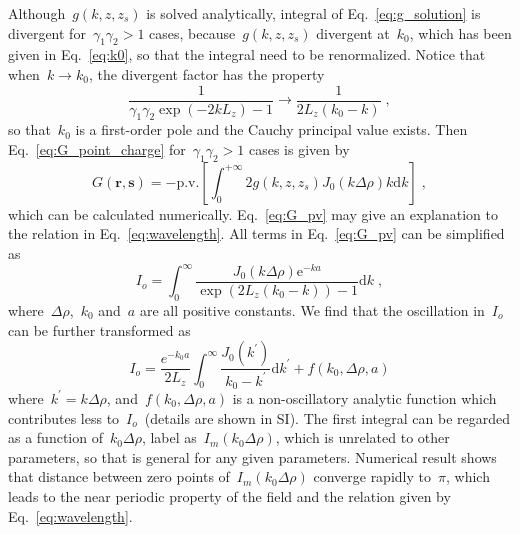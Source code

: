 \documentclass[aps,prl,reprint,showpacs,floatfix,superscriptaddress]{revtex4-2}
\newcommand{\V}[1]{\boldsymbol{#1}} %
\newcommand{\D}[1]{\Delta#1} %
\begin{document}
Although~$g(k, z, z_s)$ is solved analytically, integral of Eq.~\eqref{eq:g_solution} is divergent for~$\gamma_1 \gamma_2 > 1$ cases, because~$g(k, z, z_s)$ divergent at~$k_0$, which has been given in Eq.~\eqref{eq:k0}, so that the integral need to be renormalized.
Notice that when~$k \to k_0$, the divergent factor has the property
\begin{equation}
    \frac{1}{\gamma_1 \gamma_2 \exp{(-2 k L_z)} - 1} \to \frac{1}{2 L_z (k_0 - k)}\;,
\end{equation}
so that~$k_0$ is a first-order pole and the Cauchy principal value exists.
Then Eq.~\eqref{eq:G_point_charge} for~$\gamma_1 \gamma_2 > 1$ cases is given by
\begin{equation}\label{eq:G_pv}
    G(\V{r}, \V{s}) = - \text{p.v.} \left[ \int_{0}^{+\infty} 2 g(k, z, z_s) J_0(k \Delta \rho) k \text{d}k \right]  \;,
\end{equation}
which can be calculated numerically.
Eq.~\eqref{eq:G_pv} may give an explanation to the relation in Eq.~\eqref{eq:wavelength}.
All terms in Eq.~\eqref{eq:G_pv} can be simplified as 
\begin{equation}
    I_o = \int_0^{\infty} \frac{J_0(k \D \rho) \text{e}^{-ka}}{\exp{\left( 2 L_z (k_0 - k) \right)} - 1} \text{d}k\;,
\end{equation}
where~$\D \rho$,~$k_0$ and~$a$ are all positive constants.
We find that the oscillation in~$I_o$ can be further transformed as
\begin{equation}
    I_{o} = \frac{e^{-k_0 a}}{2L_z} \int_0^{\infty} \frac{J_0(k^\prime)}{k_0 - k^\prime} \text{d}k^\prime + f(k_0, \D \rho, a)
\end{equation}
where~$k^\prime = k \D \rho$, and~$f(k_0, \D \rho, a)$ is a non-oscillatory analytic function which contributes less to~$I_o$~(details are shown in SI).
The first integral can be regarded as a function of~$k_0 \D \rho$, label as~$I_{m} (k_0 \D \rho)$, which is unrelated to other parameters, so that is general for any given parameters.
Numerical result shows that distance between zero points of~$I_{m} (k_0 \D \rho)$ converge rapidly to~$\pi$, which leads to the near periodic property of the field and the relation given by Eq.~\eqref{eq:wavelength}.
\end{document}
